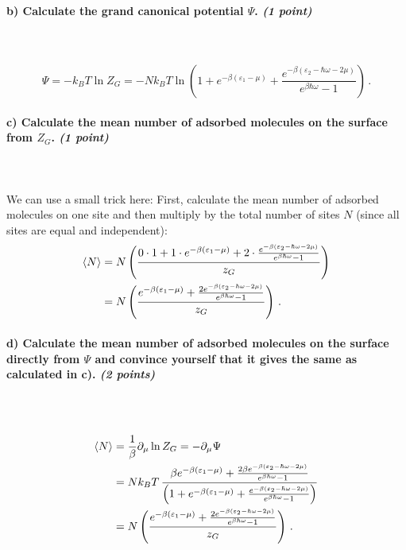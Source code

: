 \paragraph{b) Calculate the grand canonical potential $\Psi$. 
    \textit{(1 point)}
} \ \\
\\
    \begin{equation}
	\Psi
        =-k_B T\ln Z_G=- Nk_BT\ln\left(1+e^{-\beta(\varepsilon_1-\mu)} 
	+\frac{e^{-\beta(\varepsilon_2-\hbar\omega-2\mu)}}
        {e^{\beta\hbar\omega}-1}\right) \,.
\end{equation}
\newpage

\paragraph{c) Calculate the mean number of adsorbed molecules on the 
    surface from $Z_G$. \textit{(1 point)}
} \ \\
\\
    We can use a small trick here: First, calculate the mean number of adsorbed
    molecules on one site and then multiply by the total number of sites $N$
    (since all sites are equal and independent):
    \begin{align}
	\langle N\rangle 
        &=N\left(
            \frac{0\cdot1+1\cdot e^{-\beta(\varepsilon_1-\mu)}
	    +2\cdot\frac{e^{-\beta(\varepsilon_2-\hbar\omega-2\mu)}}
            {e^{\beta\hbar\omega}-1}}{z_G}
        \right)\notag \\
	&= N\left(\frac{e^{-\beta(\varepsilon_1-\mu)}
	+\frac{2e^{-\beta(\varepsilon_2-\hbar\omega-2\mu)}}
        {e^{\beta\hbar\omega}-1}}{z_G} \right) \,.
    \end{align}

\paragraph{d) Calculate the mean number of adsorbed molecules on the 
    surface directly from $\Psi$ and convince yourself that it gives 
    the same as calculated in c). 
    \textit{(2 points)}
} \ \\
\\
    \begin{align}
	\langle N\rangle 
        &=\frac{1}{\beta}\partial_{\mu}\ln Z_G=-\partial_{\mu}\Psi \notag \\
	&=Nk_BT \, \frac{\beta e^{-\beta(\varepsilon_1-\mu)}
	    +\frac{2\beta e^{-\beta(\varepsilon_2 - \hbar\omega - 2\mu)}}
            {e^{\beta\hbar\omega}-1}}{\left(
                1 + e^{-\beta (\varepsilon_1 - \mu)} 
	        +\frac{e^{-\beta(\varepsilon_2-\hbar\omega-2\mu)}}
                {e^{\beta\hbar\omega}-1}
            \right)}\notag \\
	&=N\left(
            \frac{e^{-\beta(\varepsilon_1-\mu)}
            +\frac{2e^{-\beta(\varepsilon_2-\hbar\omega-2\mu)}}
            {e^{\beta\hbar\omega}-1}}{z_G} 
        \right) \,.
    \end{align}

